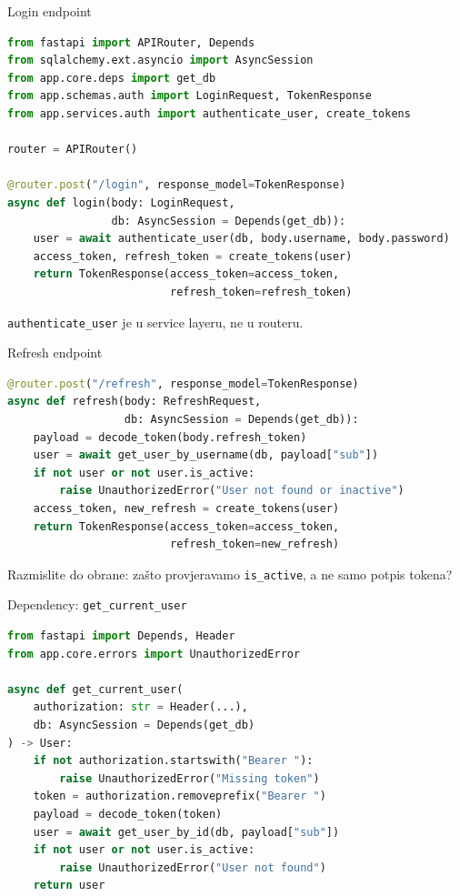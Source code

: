 \begin{frame}[fragile, shrink=10]{Login endpoint}
\begin{lstlisting}[language=python]
from fastapi import APIRouter, Depends
from sqlalchemy.ext.asyncio import AsyncSession
from app.core.deps import get_db
from app.schemas.auth import LoginRequest, TokenResponse
from app.services.auth import authenticate_user, create_tokens

router = APIRouter()

@router.post("/login", response_model=TokenResponse)
async def login(body: LoginRequest,
                db: AsyncSession = Depends(get_db)):
    user = await authenticate_user(db, body.username, body.password)
    access_token, refresh_token = create_tokens(user)
    return TokenResponse(access_token=access_token,
                         refresh_token=refresh_token)
\end{lstlisting}

	\vspace{0.4em}
	\texttt{authenticate\_user} je u service layeru, ne u routeru.
\end{frame}

\begin{frame}[fragile,shrink=5]{Refresh endpoint}
\begin{lstlisting}[language=python]
@router.post("/refresh", response_model=TokenResponse)
async def refresh(body: RefreshRequest,
                  db: AsyncSession = Depends(get_db)):
    payload = decode_token(body.refresh_token)
    user = await get_user_by_username(db, payload["sub"])
    if not user or not user.is_active:
        raise UnauthorizedError("User not found or inactive")
    access_token, new_refresh = create_tokens(user)
    return TokenResponse(access_token=access_token,
                         refresh_token=new_refresh)
\end{lstlisting}

	\vspace{0.4em}
	Razmislite do obrane: zašto provjeravamo \texttt{is\_active}, a ne samo potpis tokena?
\end{frame}

\begin{frame}[fragile,shrink=5]{Dependency: \texttt{get\_current\_user}}
\begin{lstlisting}[language=python]
from fastapi import Depends, Header
from app.core.errors import UnauthorizedError

async def get_current_user(
    authorization: str = Header(...),
    db: AsyncSession = Depends(get_db)
) -> User:
    if not authorization.startswith("Bearer "):
        raise UnauthorizedError("Missing token")
    token = authorization.removeprefix("Bearer ")
    payload = decode_token(token)
    user = await get_user_by_id(db, payload["sub"])
    if not user or not user.is_active:
        raise UnauthorizedError("User not found")
    return user
\end{lstlisting}
\end{frame}

